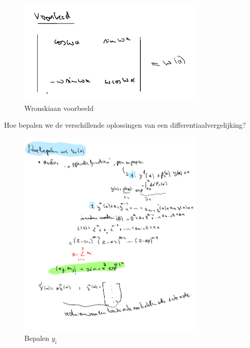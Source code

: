 \documentclass[a4paper]{report}
\begin{document}
\begin{figure}[H]
	\centering
	\includegraphics[width=0.8\textwidth]{assets/wronskiaan_voorbeeld.png}
	\caption{Wronskiaan voorbeeld}
	\label{fig:wronskiaan_voorbeeld}
\end{figure}

Hoe bepalen we de verschillende oplossingen van een differentiaalvergelijking?


\begin{figure}[H]
	\centering
	\includegraphics[width=0.8\textwidth]{assets/bepalen_y_i.png}
	\caption{Bepalen $y_i$}
	\label{fig:bepalen_y_i}
\end{figure}
\end{document}
